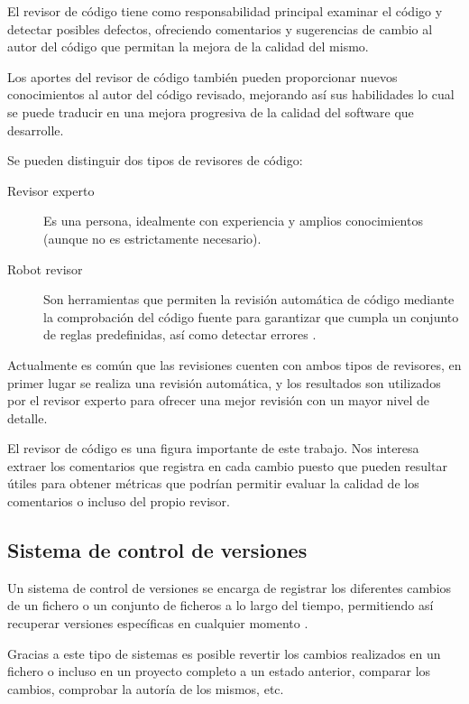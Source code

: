 El revisor de código tiene como responsabilidad principal examinar el código y detectar posibles defectos, ofreciendo comentarios y sugerencias de cambio al autor del código que permitan la mejora de la calidad del mismo.

Los aportes del revisor de código también pueden proporcionar nuevos conocimientos al autor del código revisado, mejorando así sus habilidades lo cual se puede traducir en una mejora progresiva de la calidad del software que desarrolle.

Se pueden distinguir dos tipos de revisores de código:

\begin{description}
	\item[Revisor experto] Es una persona, idealmente con experiencia y amplios conocimientos (aunque no es estrictamente necesario).
	\item[Robot revisor] Son herramientas que permiten la revisión automática de código mediante la comprobación del código fuente para garantizar que cumpla un conjunto de reglas predefinidas, así como detectar errores \cite{wiki:001}.
\end{description}

Actualmente es común que las revisiones cuenten con ambos tipos de revisores, en primer lugar se realiza una revisión automática, y los resultados son utilizados por el revisor experto para ofrecer una mejor revisión con un mayor nivel de detalle.

El revisor de código es una figura importante de este trabajo. Nos interesa extraer los comentarios que registra en cada cambio puesto que pueden resultar útiles para obtener métricas que podrían permitir evaluar la calidad de los comentarios o incluso del propio revisor.

\subsection{Sistema de control de versiones}

Un sistema de control de versiones se encarga de registrar los diferentes cambios de un fichero o un conjunto de ficheros a lo largo del tiempo, permitiendo así recuperar versiones específicas en cualquier momento \cite{Chacon:2014:PG:2695634}.

Gracias a este tipo de sistemas es posible revertir los cambios realizados en un fichero o incluso en un proyecto completo a un estado anterior, comparar los cambios, comprobar la autoría de los mismos, etc.

